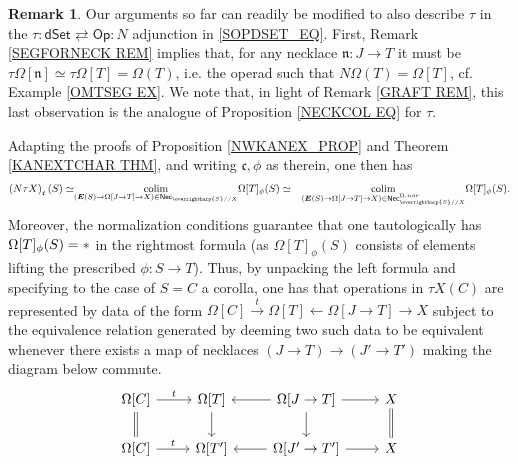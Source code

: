 \documentclass[a4paper,10pt]{article}%
\numberwithin{equation}{section}
\numberwithin{figure}{section}
\theoremstyle{definition} %
\newtheorem{remark}[equation]{Remark}%
\newcommand{\vect}[1]{\text{\overrightharp{\ensuremath{#1}}}}
\newcommand{\Op}{\mathsf{Op}}
\newcommand{\dSet}{\mathsf{dSet}}
\DeclareMathOperator{\colim}{colim}
\begin{document}
\begin{remark}\label{TAUFUNEX REM}
	Our arguments so far can readily be modified 
	to also describe $\tau$ in the 
	$\tau \colon \dSet \rightleftarrows \Op \colon N$
	adjunction in \eqref{SOPDSET_EQ}.
	First, Remark \ref{SEGFORNECK REM} implies that,
	for any necklace 
	$\mathfrak{n} \colon J \to T$ it must be 
	$\tau \Omega[\mathfrak{n}] \simeq
	\tau \Omega[T] = \Omega(T)$,
	i.e. the operad such that $N\Omega(T) = \Omega[T]$,
	cf. Example \ref{OMTSEG EX}.
	We note that, in light of Remark \ref{GRAFT REM},
	this last observation is the analogue of 
	Proposition \ref{NECKCOL EQ} for $\tau$.
	
	Adapting the proofs of 
	Proposition \ref{NWKANEX_PROP} and
	Theorem \ref{KANEXTCHAR THM},
	and writing $\mathfrak{c},\phi$ as therein, one then has
\begin{equation}
\begin{aligned}
	\left(N \tau X\right)_{\mathfrak{c}}(S) 
	\simeq &
\underset{(\boldsymbol{E}(S) \to 
	\Omega[J \to T] \to X)
	\in \mathsf{Nec}_{\vect{S}//X}}{\colim}
	\Omega[T]_{\phi}(S)
	\simeq &
\underset{(\boldsymbol{E}(S) \to 
	\Omega[J \to T] \to X)
	\in \mathsf{Nec}^{\Omega,nor}_{\vect{S}//X}}{\colim}
	\Omega[T]_{\phi}(S).
\end{aligned}
\end{equation}
Moreover, the normalization conditions guarantee
that one tautologically has  
$\Omega[T]_{\phi}(S) = \**$
in the rightmost formula
(as $\Omega[T]_{\phi}(S)$ consists of elements lifting the prescribed $\phi\colon S \to T$).
Thus, by unpacking the left formula and specifying to the case of
$S=C$ a corolla,
one has that operations in
$\tau X(C)$
are represented by 
data of the form
$
	\Omega[C]
	\xrightarrow{t}
	\Omega[T]
	\leftarrow
	\Omega[J \to T]
	\to X
$
subject to the equivalence relation
generated by deeming two such data to be equivalent whenever there exists a map of necklaces
$(J \to T) \to (J' \to T')$
making the diagram below commute.
\[
\begin{tikzcd}
	\Omega[C] \ar{r}{t} \ar[equal]{d} &
	\Omega[T] \ar{d} &
	\Omega[J \to T] \ar{l} \ar{r} \ar{d} &
	X \ar[equal]{d}
\\
	\Omega[C] \ar{r}{t} &
	\Omega[T'] &
	\Omega[J' \to T'] \ar{l} \ar{r} &
	X
\end{tikzcd}
\]
\end{remark}
\end{document}
